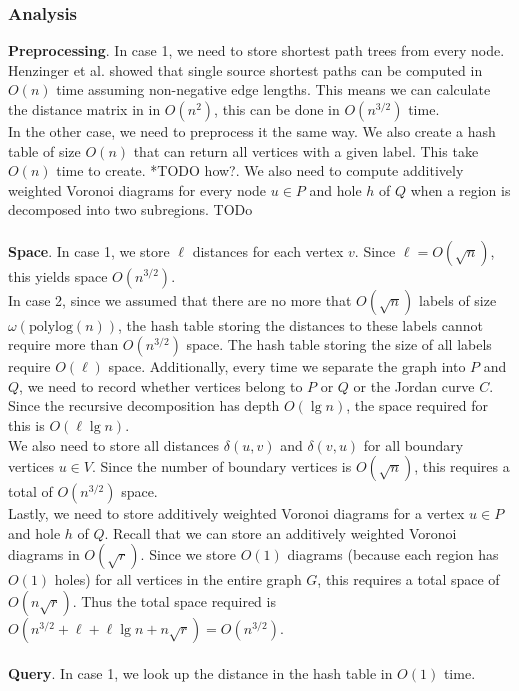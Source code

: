\subsubsection{Analysis}\label{oracle2analysis}
\textbf{Preprocessing}.
In case 1, we need to store shortest path
trees from every node. Henzinger et al. showed that single source shortest paths can be
computed in $O(n)$ time \cite{henzinger1997faster} assuming non-negative edge lengths.
This means we can calculate the distance matrix in in $O(n^2)$, this
can be done in $O(n^{3/2})$ time. \\
In the other case, we need to preprocess it the same way. We also create a hash table of
size $O(n)$ that can return all vertices with a given label. This take $O(n)$ time to
create. *TODO how?. We also need to compute
additively weighted Voronoi diagrams for every node $u\in P$ and hole $h$ of $Q$ when a
region is decomposed into two subregions. TODo \\
\\
\textbf{Space}.
In case 1, we store $\ell$ distances for each vertex $v$. Since $\ell=O(\sqrt{n})$, this
yields space $O(n^{3/2})$. \\
In case 2, since we assumed that there are no more that
$O(\sqrt{n})$ labels of size $\omega(\text{polylog}(n))$, the hash table storing the
distances to these labels cannot require more than $O(n^{3/2})$ space. The hash table
storing the size of all labels require $O(\ell)$ space. Additionally, every time we
separate the graph into $P$ and $Q$, we need to record whether vertices belong to $P$ or
$Q$ or the Jordan curve $C$. Since the recursive decomposition has depth $O(\lg n)$, the
space required for this is $O(\ell\lg n)$. \\
We also need to store all distances $\delta(u,v)$ and $\delta(v,u)$ for all
boundary vertices $u\in V$. Since the number of boundary vertices is $O(\sqrt{n})$, this
requires a total of $O(n^{3/2})$ space. \\
Lastly, we need to store additively weighted Voronoi diagrams for a vertex $u\in P$ and
hole $h$ of $Q$. Recall that we can store an additively weighted Voronoi diagrams in
$O(\sqrt{r})$. Since we store $O(1)$ diagrams (because each region has $O(1)$ holes) for
all vertices in the entire graph $G$, this requires a total space of $O(n\sqrt{r})$.
Thus the total space required is $O(n^{3/2}+\ell+\ell\lg n+n\sqrt{r})=O(n^{3/2})$. \\
\\
\textbf{Query}.
In case 1, we look up the distance in the hash table in $O(1)$ time.\\
